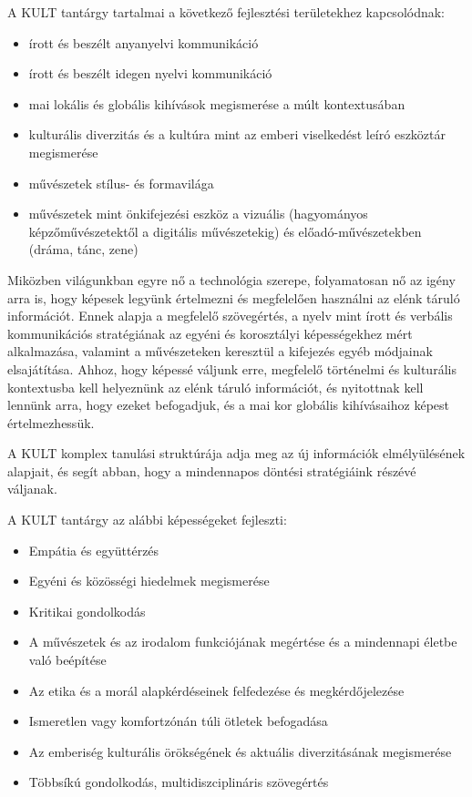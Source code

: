 A KULT tantárgy tartalmai a következő fejlesztési területekhez kapcsolódnak:
\begin{itemize}
  \item írott és beszélt anyanyelvi kommunikáció

  \item írott és beszélt idegen nyelvi kommunikáció

  \item mai lokális és globális kihívások megismerése a múlt kontextusában

  \item kulturális diverzitás és a kultúra mint az emberi viselkedést leíró
        eszköztár megismerése

  \item művészetek stílus- és formavilága

  \item művészetek mint önkifejezési eszköz a vizuális (hagyományos
        képzőművészetektől a digitális művészetekig) és előadó-művészetekben (dráma,
        tánc, zene)
\end{itemize}

Miközben világunkban egyre nő a technológia szerepe, folyamatosan nő az igény
arra is, hogy képesek legyünk értelmezni és megfelelően használni az elénk
táruló információt. Ennek alapja a megfelelő szövegértés, a nyelv mint írott és
verbális kommunikációs stratégiának az egyéni és korosztályi képességekhez mért
alkalmazása, valamint a művészeteken keresztül a kifejezés egyéb módjainak
elsajátítása. Ahhoz, hogy képessé váljunk erre, megfelelő történelmi és
kulturális kontextusba kell helyeznünk az elénk táruló információt, és
nyitottnak kell lennünk arra, hogy ezeket befogadjuk, és a mai kor globális
kihívásaihoz képest értelmezhessük.

A KULT komplex tanulási struktúrája adja meg az új információk elmélyülésének
alapjait, és segít abban, hogy a mindennapos döntési stratégiáink részévé
váljanak.

A KULT tantárgy az alábbi képességeket fejleszti:
\begin{itemize}
  \item Empátia és együttérzés

  \item Egyéni és közösségi hiedelmek megismerése

  \item Kritikai gondolkodás

  \item A művészetek és az irodalom funkciójának megértése és a mindennapi életbe
        való beépítése

  \item Az etika és a morál alapkérdéseinek felfedezése és megkérdőjelezése

  \item Ismeretlen vagy komfortzónán túli ötletek befogadása

  \item Az emberiség kulturális örökségének és aktuális diverzitásának
        megismerése

  \item Többsíkú gondolkodás, multidiszciplináris szövegértés
\end{itemize}

